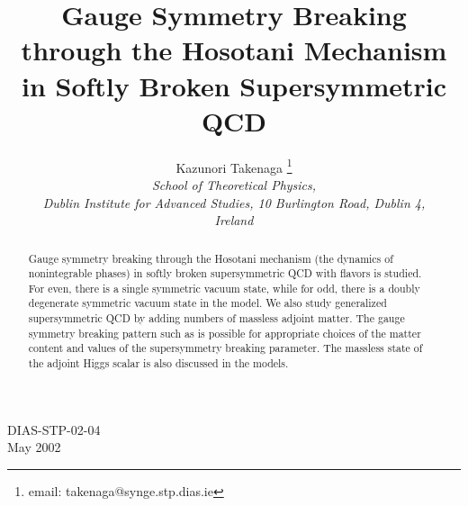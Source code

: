 \documentclass[a4paper,12pt]{article}
\begin{document}
\title{Gauge Symmetry Breaking through the Hosotani Mechanism in 
Softly Broken Supersymmetric QCD}
\author{Kazunori Takenaga \vspace{1cm}\myHighlight{$^{}$}\coordHE{}\thanks {email: 
takenaga@synge.stp.dias.ie}\\ 
\it {School of Theoretical Physics,}\\ 
{\it Dublin Institute for Advanced Studies, 10 Burlington Road, 
Dublin 4,}\\
{\it Ireland}}
\date{} %
\maketitle
\baselineskip=18pt
\vskip 2cm
\begin{abstract}
Gauge symmetry breaking through the Hosotani mechanism (the 
dynamics of nonintegrable phases) in softly 
broken supersymmetric QCD with \coordHE{} flavors is studied. 
For \coordHE{} even, there is a single \coordHE{} symmetric vacuum 
state, while for \coordHE{} odd, there is a doubly degenerate 
\coordHE{} symmetric vacuum state in the model. 
We also study generalized supersymmetric 
QCD by adding \coordHE{} numbers of massless 
adjoint matter. The gauge symmetry breaking pattern
such as \coordHE{} 
is possible for appropriate choices of the matter content and 
values of the supersymmetry breaking parameter. 
The massless state of the adjoint 
Higgs scalar is also discussed in the models.
\end{abstract}
\vskip 2cm
\begin{flushleft}
DIAS-STP-02-04\\
May 2002\\
\end{flushleft}
\begin{center}
\end{center}
\addtolength{\parindent}{2pt}
\newpage
\end{document}
